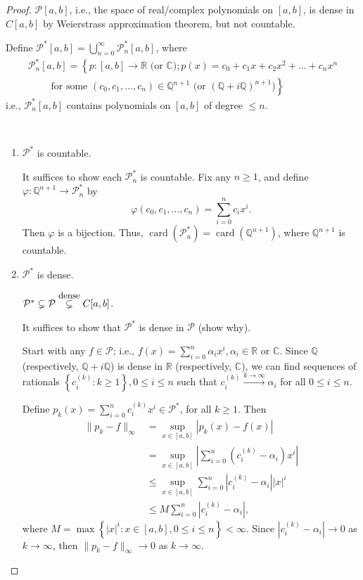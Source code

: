 \documentclass[letterpaper, reqno,11pt]{article}
\newcommand{\RR}{\mathbb{R}}
\newcommand{\CC}{\mathbb{C}}
\newcommand{\QQ}{\mathbb{Q}}
\DeclareMathOperator{\card}{card}
\begin{document}
\begin{proof}
  $\mathcal P[a, b]$, i.e., the space of real/complex polynomials on $[a, b]$, is dense in $C[a, b]$ by Weierstrass approximation theorem, but not countable.

  Define $\mathcal P^*[a, b] = \bigcup_{n = 0}^\infty \mathcal P_n^* [a,b]$, where
  \begin{multline*}
    \mathcal P_n^*[a, b] = \left\{ p : [a, b] \to \RR \text{ (or $\CC$)} ; p(x) = c_0 + c_1 x + c_2 x^2 + \ldots + c_n x^n \right. \\
    \qquad \left. \text{ for some } (c_0, c_1, \ldots, c_n) \in \QQ^{n + 1} \text{ (or $(\QQ + i\QQ)^{n + 1}$)} \right\}
  \end{multline*}
  i.e., $\mathcal P_n^*[a, b]$ contains polynomials on $[a, b]$ of degree $\leq n$.
  
  ~
  
  \begin{enumerate}
  \item $\mathcal P^*$ is countable.

    It suffices to show each $\mathcal P_n^*$ is countable. Fix any $n \geq 1$, and define $\varphi : \QQ^{n + 1} \to \mathcal P_n^*$ by
    $$ \varphi(c_0, c_1, \ldots, c_n) = \sum_{i = 0}^n c_i x^i. $$
    Then $\varphi$ is a bijection. Thus, $\card\left(\mathcal P_n^*\right) = \card\left(\QQ^{n + 1}\right)$, where $\QQ^{n + 1}$ is countable.
  \item $\mathcal P^*$ is dense.
    
     $\mathcal P^* \subsetneq \mathcal P \overset{\text{\small dense}}{\subsetneq} C[a, b]$.

    It suffices to show that $\mathcal P^*$ is dense in $\mathcal P$ (show why).

    Start with any $f \in \mathcal P$; i.e., $f(x) = \sum_{i = 0}^n \alpha_i x^i, \alpha_i \in \RR \text{ or } \CC$. Since $\QQ$ (respectively, $\QQ + i\QQ$) is dense in $\RR$ (respectively, $\CC$), we can find sequences of rationals $\left\{ c_i^{(k)} : k \geq 1 \right\}, 0 \leq i \leq n$ such that $c_i^{(k)} \xrightarrow{k \to \infty}\alpha_i$ for all $0 \leq i \leq n$.

    Define $p_k(x) = \sum_{i = 0}^n c_i^{(k)} x^i \in \mathcal P^*$, for all $k \geq 1$. Then
    \begin{align*}
      \lVert p_k - f \rVert_\infty &= \sup_{x \in [a, b]} |p_k(x) - f(x)| \\
      &= \sup_{x \in [a, b]} \left|\sum_{i = 0}^n \left(c_i^{(k)} - \alpha_i\right) x^i\right| \\
      &\leq \sup_{x \in [a, b]} \sum_{i = 0}^n \left|c_i^{(k)} - \alpha_i\right| |x|^i \\
      &\leq M \sum_{i = 0}^n \left|c_i^{(k)} - \alpha_i\right|,
    \end{align*}
    where $M = \max\left\{ |x|^i : x \in [a, b], 0 \leq i \leq n \right\} < \infty$. Since $\left|c_i^{(k)} - \alpha_i\right| \to 0$ as $k \to \infty$, then $\lVert p_k - f\rVert_\infty \to 0$ as $k \to \infty$.
  \end{enumerate}
\end{proof}
\end{document}
